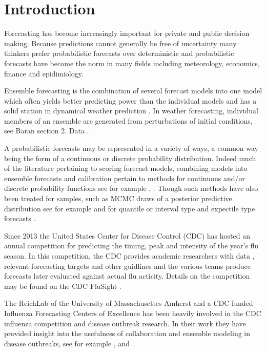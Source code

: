 \documentclass{article}\usepackage[]{graphicx}\usepackage[]{color}
\begin{document}
\section{Introduction}
Forecasting has become increasingly important for private and public decision 
making. Because predictions cannot generally be free of uncertainty many 
thinkers prefer probabilistic forecasts over deterministic and probabilistic 
forecasts have become the norm in many fields including meteorology, economics,
finance and epidimiology.

Ensemble forecasting is the combination of several forecast models into one 
model which often yields better predicting power than the individual models
\cite{cramer2021evaluation} and has a solid station in dynamical weather 
prediction \cite{lewis2005roots}. In weather forecasting, individual members of 
an ensemble are generated from perturbations of initial conditions, see Baran 
section 2. Data \cite{baran2018combining} \cite{leutbecher2008ensemble}.
\cite{yamana2016superensemble}

A probabilistic forecasts may be represented in a variety of ways, a common way
being the form of a continuous or discrete probability distribution. Indeed much 
of the literature pertaining to scoring forecast models, combining models 
into ensemble forecasts and calibration pertain to methods for continuous
and/or discrete probability functions see for example 
\cite{gneiting2007probabilistic},
\cite{gneiting2013combining} \cite{baran2018combining}. Though such methods have
also been treated for samples, such as MCMC draws of a posterior predictive
distribution see for example \cite{krueger2016probabilistic}
and for quantile or interval type and expectile type forecasts 
\cite{taylor2021evaluating} \cite{bracher2021evaluating}.

Since 2013 the United States Center for Disease Control (CDC) has hosted an
annual competition for predicting the timing, peak and intensity of the year's 
flu season. In this competition, the CDC provides academic researchers with data
, relevant forecasting targets and other guidlines and the various teams produce
forecasts later evaluated against actual flu acticity. Details on the 
competition may be found on the CDC FluSight \cite{cdcflusight}.

The ReichLab of the University of Massachusettes Amherst and a 
CDC-funded Influenza Forecasting Centers of Excellence has been heavily 
involved in the CDC influenza competition and disease outbreak research.
In their work they have provided insight into the usefulness of collaboration 
and ensemble modeling in disease outbreaks, see for example 
\cite{reich2019collaborative}, \cite{reich2019accuracy} and 
\cite{mcandrew2019adaptively}.
\end{document}
